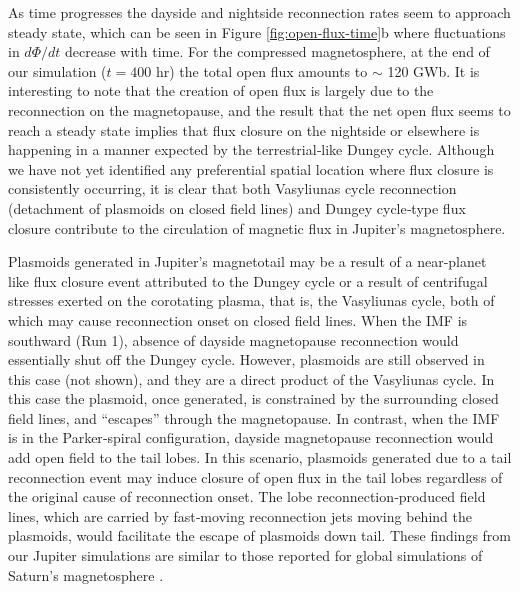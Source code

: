 As time progresses the dayside and nightside reconnection rates seem to approach steady state, which can be seen in Figure \ref{fig:open-flux-time}b where fluctuations in $d\Phi/dt$ decrease with time. For the compressed magnetosphere, at the end of our simulation ($t = 400$ hr) the total open flux amounts to $\sim$ 120 GWb. It is interesting to note that the creation of open flux is largely due to the reconnection on the magnetopause, and the result that the net open flux seems to reach a steady state implies that flux closure on the nightside or elsewhere is happening in a manner expected by the terrestrial‐like Dungey cycle. Although we have not yet identified any preferential spatial location where flux closure is consistently occurring, it is clear that both Vasyliunas cycle reconnection (detachment of plasmoids on closed field lines) and Dungey cycle‐type flux closure contribute to the circulation of magnetic flux in Jupiter's magnetosphere. 

Plasmoids generated in Jupiter's magnetotail may be a result of a near‐planet like flux closure event attributed to the Dungey cycle or a result of centrifugal stresses exerted on the corotating plasma, that is, the Vasyliunas cycle, both of which may cause reconnection onset on closed field lines. When the IMF is southward (Run 1), absence of dayside magnetopause reconnection would essentially shut off the Dungey cycle. However, plasmoids are still observed in this case (not shown), and they are a direct product of the Vasyliunas cycle. In this case the plasmoid, once generated, is constrained by the surrounding closed field lines, and “escapes” through the magnetopause. In contrast, when the IMF is in the Parker‐spiral configuration, dayside magnetopause reconnection would add open field to the tail lobes. In this scenario, plasmoids generated due to a tail reconnection event may induce closure of open flux in the tail lobes \cite{Cowley2008} regardless of the original cause of reconnection onset. The lobe reconnection‐produced field lines, which are carried by fast‐moving reconnection jets moving behind the plasmoids, would facilitate the escape of plasmoids down tail. These findings from our Jupiter simulations are similar to those reported for global simulations of Saturn's magnetosphere \cite{Jia2012}. 

